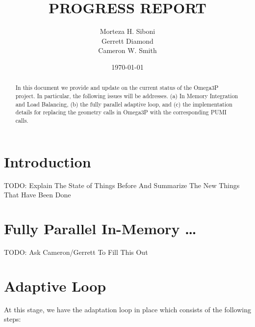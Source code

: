 \documentclass[review,authoryear,12pt]{elsarticle_summary_report}
\begin{document}
\title{PROGRESS REPORT}%

\author[]{Morteza H. Siboni \\
Gerrett Diamond \\
Cameron W. Smith}



\date{\today}



\begin{abstract}
  In this document we provide and update on the current status of the Omega3P project. In particular, the following issues will be addresses. (a) In Memory Integration and Load Balancing, (b) the fully parallel adaptive loop, and (c) the implementation details for replacing the geometry calls in Omega3P  with the corresponding PUMI calls.
\end{abstract}


\maketitle




\section{Introduction}
TODO: Explain The State of Things Before And Summarize The New Things That Have Been Done

\section{Fully Parallel In-Memory \dots}
TODO: Ask Cameron/Gerrett To Fill This Out

\section{Adaptive Loop}
At this stage, we have the adaptation loop in place which consists of the following steps:
\end{document}
